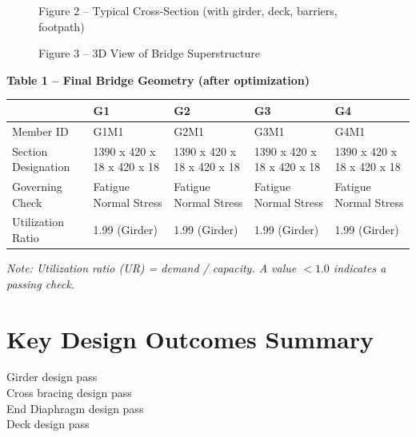 \documentclass[12pt,a4paper]{report}
\numberwithin{table}{chapter}
\numberwithin{figure}{chapter}
\begin{document}
\newpage

\begin{figure}[H]
\centering
{}
\caption*{Figure 2 -- Typical Cross-Section (with girder, deck, barriers, footpath)}
\end{figure}

\begin{figure}[H]
\centering
{}
\caption*{Figure 3 -- 3D View of Bridge Superstructure}
\end{figure}

\noindent\textbf{Table 1 -- Final Bridge Geometry (after optimization)}

\vspace{0.4em}
\noindent
\begin{tabular}{|C{2.8cm}|C{3.0cm}|C{3.0cm}|C{3.0cm}|C{3.0cm}|}
\hline
  \textbf{} &
  \textbf{G1} &
  \textbf{G2} &
  \textbf{G3} &
  \textbf{G4} \\
\hline
Member ID & G1M1 & G2M1 & G3M1 & G4M1 \\
\hline
Section Designation & 1390 x 420 x 18 x 420 x 18 & 1390 x 420 x 18 x 420 x 18 & 1390 x 420 x 18 x 420 x 18 & 1390 x 420 x 18 x 420 x 18 \\
\hline
Governing Check & Fatigue Normal Stress & Fatigue Normal Stress & Fatigue Normal Stress & Fatigue Normal Stress \\
\hline
Utilization Ratio & 1.99 (Girder) & 1.99 (Girder) & 1.99 (Girder) & 1.99 (Girder) \\
\hline
\end{tabular}

\vspace{0.4em}
\noindent\textit{Note: Utilization ratio (UR) = demand / capacity. A value $< 1.0$ indicates a passing check.}

\vspace{1em}

\section*{Key Design Outcomes Summary}
\label{sec:key-outcomes}

\noindent Girder design pass \\
Cross bracing design pass \\
End Diaphragm design pass \\
Deck design pass
\end{document}
